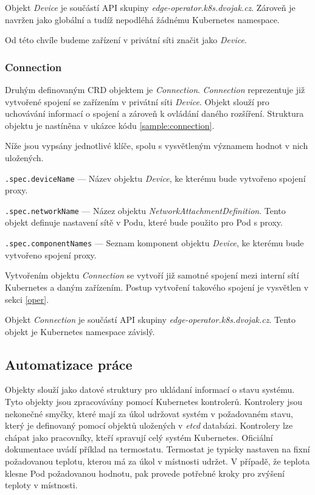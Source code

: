 Objekt \textit{Device} je součástí API skupiny \textit{edge-operator.k8s.dvojak.cz}. Zároveň je navržen jako globální a tudíž nepodléhá žádnému Kubernetes namespace.

\bigskip

Od této chvíle budeme zařízení v privátní síti značit jako \textit{Device}.

\subsubsection*{Connection}
Druhým definovaným CRD objektem je \textit{Connection}. \textit{Connection} reprezentuje již vytvořené spojení se zařízením v privátní síti \textit{Device}. Objekt slouží pro uchovávání informací o spojení a zároveň k ovládání daného rozšíření. Struktura objektu je nastíněna v ukázce kódu \ref{sample:connection}.



Níže jsou vypsány jednotlivé klíče, spolu s vysvětleným významem hodnot v nich uložených.

\begin{description}
    \item \verb|.spec.deviceName| --- Název objektu \textit{Device}, ke kterému bude vytvořeno spojení proxy. 
    \item \verb|.spec.networkName| --- Názez objektu \textit{NetworkAttachmentDefinition}. Tento objekt definuje nastavení sítě v Podu, které bude použito pro Pod s proxy.
    \item \verb|.spec.componentNames| --- Seznam komponent objektu \textit{Device}, ke kterému bude vytvořeno spojení proxy. 
\end{description}

Vytvořením objektu \textit{Connection} se vytvoří již samotné spojení mezi interní sítí Kubernetes a daným zařízením. Postup vytvoření takového spojení je vysvětlen v sekci \ref{oper}.

\bigskip

Objekt \textit{Connection} je součástí API skupiny \textit{edge-operator.k8s.dvojak.cz}. Tento objekt je Kubernetes namespace závislý.

\subsection{Automatizace práce}\label{sec:operator}
Objekty slouží jako datové struktury pro ukládaní informací o stavu systému. Tyto objekty jsou zpracovávány pomocí Kubernetes kontrolerů. Kontrolery jsou nekonečné smyčky, které mají za úkol udržovat systém v požadovaném stavu, který je definovaný pomocí objektů uložených v \textit{etcd} databázi. Kontrolery lze chápat jako pracovníky, kteří spravují celý systém Kubernetes. Oficiální dokumentace uvádí příklad na termostatu. Termostat je typicky nastaven na fixní požadovanou teplotu, kterou má za úkol v místnosti udržet. V případě, že teplota klesne Pod požadovanou hodnotu, pak provede potřebné kroky pro zvýšení teploty v místnosti.

